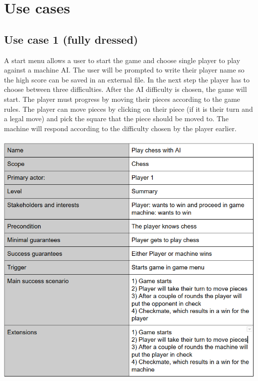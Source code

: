 \documentclass{article}
\begin{document}
    \vspace{100mm}
    \section{Use cases}
        \subsection{Use case 1 (fully dressed)}
        A start menu allows a user to start the game and choose single player to
        play against a machine AI. The user will be prompted to write their player
        name so the high score can be saved in an external file. In the next step
        the player has to choose between three difficulties. After the AI difficulty
        is chosen, the game will start. The player must progress by moving their
        pieces according to the game rules. The player can move pieces by clicking
        on their piece (if it is their turn and a legal move) and pick the square that
        the piece should be moved to. The machine will respond according to the
        difficulty chosen by the player earlier. \\ \\
        \includegraphics[width=\linewidth]{play-ai.png}

        \vspace{30mm}
\end{document}
